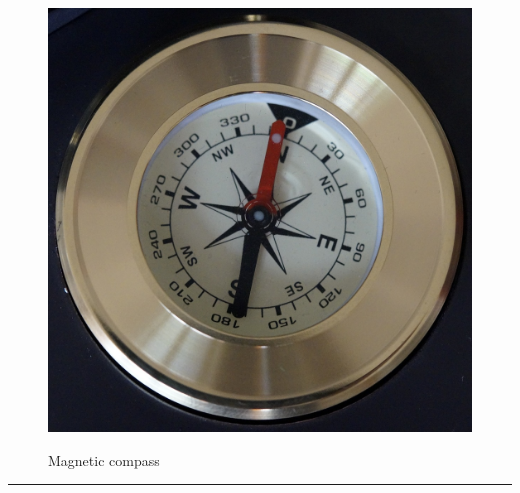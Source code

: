 \documentclass{article}
\begin{document}
    \begin{figure}[H]
        \centering
        \begin{minipage}{0.25\textwidth}
            \centering
            \includegraphics[width=\textwidth]{../SurvivalItemImages/compass}
        \end{minipage}\hfill
        \begin{minipage}{0.7\textwidth}
            \centering
            \Large Magnetic compass
        \end{minipage}
    \end{figure}
    \vspace{-0.8em}
    \noindent\rule{\textwidth}{0.4pt}
            
\end{document}
